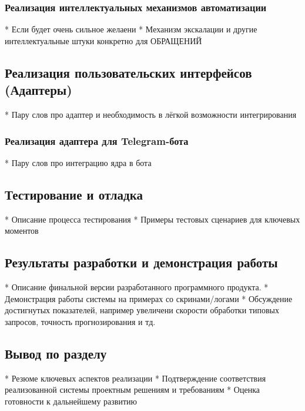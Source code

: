 \subsubsection{Реализация интеллектуальных механизмов автоматизации}
*   Если будет очень сильное желаени
*   Механизм экскалации и другие интеллектуальные штуки конкретно для ОБРАЩЕНИЙ

\subsection{Реализация пользовательских интерфейсов (Адаптеры)}

*   Пару слов про адаптер и необходимость в лёгкой возможности интегрирования

\subsubsection{Реализация адаптера для Telegram-бота}

*   Пару слов про интеграцию ядра в бота

\subsection{Тестирование и отладка}
*   Описание процесса тестирования
*   Примеры тестовых сценариев для ключевых моментов



\subsection{Результаты разработки и демонстрация работы}
*   Описание финальной версии разработанного программного продукта.
*   Демонстрация работы системы на примерах со скринами/логами
*   Обсуждение достигнутых показателей, например увеличени скорости обработки типовых запросов, точность прогнозирования и тд.


\subsection{Вывод по разделу}
*   Резюме ключевых аспектов реализации
*   Подтверждение соответствия реализованной системы проектным решениям и требованиям
*   Оценка готовности к дальнейшему развитию
